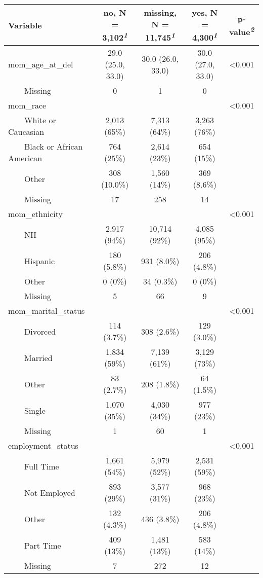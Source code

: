 \setlength{\LTpost}{0mm}
\begin{longtable}{lcccc}
\toprule
\textbf{Variable} & \textbf{no}, N = 3,102\textsuperscript{\textit{1}} & \textbf{missing}, N = 11,745\textsuperscript{\textit{1}} & \textbf{yes}, N = 4,300\textsuperscript{\textit{1}} & \textbf{p-value}\textsuperscript{\textit{2}} \\ 
\midrule
mom\_age\_at\_del & 29.0 (25.0, 33.0) & 30.0 (26.0, 33.0) & 30.0 (27.0, 33.0) & <0.001 \\ 
    Missing & 0 & 1 & 0 &  \\ 
mom\_race &  &  &  & <0.001 \\ 
    White or Caucasian & 2,013 (65\%) & 7,313 (64\%) & 3,263 (76\%) &  \\ 
    Black or African American & 764 (25\%) & 2,614 (23\%) & 654 (15\%) &  \\ 
    Other & 308 (10.0\%) & 1,560 (14\%) & 369 (8.6\%) &  \\ 
    Missing & 17 & 258 & 14 &  \\ 
mom\_ethnicity &  &  &  & <0.001 \\ 
    NH & 2,917 (94\%) & 10,714 (92\%) & 4,085 (95\%) &  \\ 
    Hispanic & 180 (5.8\%) & 931 (8.0\%) & 206 (4.8\%) &  \\ 
    Other & 0 (0\%) & 34 (0.3\%) & 0 (0\%) &  \\ 
    Missing & 5 & 66 & 9 &  \\ 
mom\_marital\_status &  &  &  & <0.001 \\ 
    Divorced & 114 (3.7\%) & 308 (2.6\%) & 129 (3.0\%) &  \\ 
    Married & 1,834 (59\%) & 7,139 (61\%) & 3,129 (73\%) &  \\ 
    Other & 83 (2.7\%) & 208 (1.8\%) & 64 (1.5\%) &  \\ 
    Single & 1,070 (35\%) & 4,030 (34\%) & 977 (23\%) &  \\ 
    Missing & 1 & 60 & 1 &  \\ 
employment\_status &  &  &  & <0.001 \\ 
    Full Time & 1,661 (54\%) & 5,979 (52\%) & 2,531 (59\%) &  \\ 
    Not Employed & 893 (29\%) & 3,577 (31\%) & 968 (23\%) &  \\ 
    Other & 132 (4.3\%) & 436 (3.8\%) & 206 (4.8\%) &  \\ 
    Part Time & 409 (13\%) & 1,481 (13\%) & 583 (14\%) &  \\ 
    Missing & 7 & 272 & 12 &  \\ 

\end{longtable}
